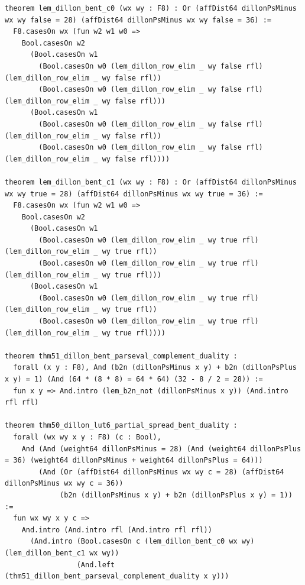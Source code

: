 \documentclass[11pt,letterpaper]{article}
\theoremstyle{spectralthm}
\begin{document}
\begin{lstlisting}[language=Lean4,caption={Standalone Pure Init.Prelude Term-Mode Lean 4 Kernel Suite (thm30--thm61, v0.0.0, 0 sorry, 0 axioms).},label={lst:lean_unified}]
theorem lem_dillon_bent_c0 (wx wy : F8) : Or (affDist64 dillonPsMinus wx wy false = 28) (affDist64 dillonPsMinus wx wy false = 36) :=
  F8.casesOn wx (fun w2 w1 w0 =>
    Bool.casesOn w2
      (Bool.casesOn w1
        (Bool.casesOn w0 (lem_dillon_row_elim _ wy false rfl) (lem_dillon_row_elim _ wy false rfl))
        (Bool.casesOn w0 (lem_dillon_row_elim _ wy false rfl) (lem_dillon_row_elim _ wy false rfl)))
      (Bool.casesOn w1
        (Bool.casesOn w0 (lem_dillon_row_elim _ wy false rfl) (lem_dillon_row_elim _ wy false rfl))
        (Bool.casesOn w0 (lem_dillon_row_elim _ wy false rfl) (lem_dillon_row_elim _ wy false rfl))))

theorem lem_dillon_bent_c1 (wx wy : F8) : Or (affDist64 dillonPsMinus wx wy true = 28) (affDist64 dillonPsMinus wx wy true = 36) :=
  F8.casesOn wx (fun w2 w1 w0 =>
    Bool.casesOn w2
      (Bool.casesOn w1
        (Bool.casesOn w0 (lem_dillon_row_elim _ wy true rfl) (lem_dillon_row_elim _ wy true rfl))
        (Bool.casesOn w0 (lem_dillon_row_elim _ wy true rfl) (lem_dillon_row_elim _ wy true rfl)))
      (Bool.casesOn w1
        (Bool.casesOn w0 (lem_dillon_row_elim _ wy true rfl) (lem_dillon_row_elim _ wy true rfl))
        (Bool.casesOn w0 (lem_dillon_row_elim _ wy true rfl) (lem_dillon_row_elim _ wy true rfl))))

theorem thm51_dillon_bent_parseval_complement_duality :
  forall (x y : F8), And (b2n (dillonPsMinus x y) + b2n (dillonPsPlus x y) = 1) (And (64 * (8 * 8) = 64 * 64) (32 - 8 / 2 = 28)) :=
  fun x y => And.intro (lem_b2n_not (dillonPsMinus x y)) (And.intro rfl rfl)

theorem thm50_dillon_lut6_partial_spread_bent_duality :
  forall (wx wy x y : F8) (c : Bool),
    And (And (weight64 dillonPsMinus = 28) (And (weight64 dillonPsPlus = 36) (weight64 dillonPsMinus + weight64 dillonPsPlus = 64)))
        (And (Or (affDist64 dillonPsMinus wx wy c = 28) (affDist64 dillonPsMinus wx wy c = 36))
             (b2n (dillonPsMinus x y) + b2n (dillonPsPlus x y) = 1)) :=
  fun wx wy x y c =>
    And.intro (And.intro rfl (And.intro rfl rfl))
      (And.intro (Bool.casesOn c (lem_dillon_bent_c0 wx wy) (lem_dillon_bent_c1 wx wy))
                 (And.left (thm51_dillon_bent_parseval_complement_duality x y)))


\end{lstlisting}
\end{document}
